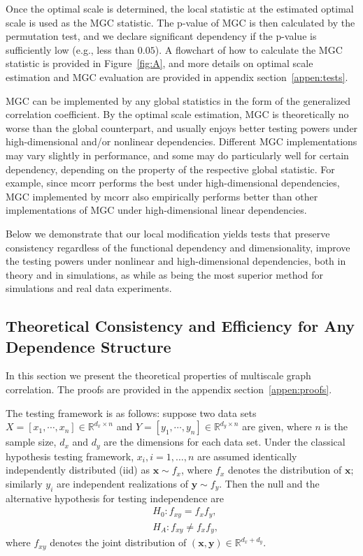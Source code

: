 \documentclass[11pt]{article}
\providecommand{\mb}[1]{\boldsymbol{#1}}
\newcommand{\Real}{\mathbb{R}}
\begin{document}
Once the optimal scale is determined, the local statistic at the estimated optimal scale is used as the MGC statistic. The p-value of MGC is then calculated by the permutation test, and we declare significant dependency if the p-value is sufficiently low (e.g., less than $0.05$). A flowchart of how to calculate the MGC statistic is provided in Figure~\ref{fig:A}, and more details on optimal scale estimation and MGC evaluation are provided in appendix section~\ref{appen:tests}.

MGC can be implemented by any global statistics in the form of the generalized correlation coefficient. By the optimal scale estimation, MGC is theoretically no worse than the global counterpart, and usually enjoys better testing powers under high-dimensional and/or nonlinear dependencies. Different MGC implementations may vary slightly in performance, and some may do particularly well for certain dependency, depending on the property of the respective global statistic. For example, since mcorr performs the best under high-dimensional dependencies, MGC implemented by mcorr also empirically performs better than other implementations of MGC under high-dimensional linear dependencies. 

Below we demonstrate that our local modification yields tests that preserve consistency regardless of the functional dependency and dimensionality, improve the testing powers under nonlinear and high-dimensional dependencies, both in theory and in simulations, as while as being the most superior method for simulations and real data experiments.


\subsection{Theoretical Consistency and Efficiency for Any Dependence Structure}
\label{main2}
In this section we present the theoretical properties of multiscale graph correlation. The proofs are provided in the appendix section~\ref{appen:proofs}. 

The testing framework is as follows: suppose two data sets $X=[x_{1},\cdots, x_{n}] \in \Real^{d_{x} \times n}$ and $Y=[y_{1},\cdots, y_{n}] \in \Real^{d_{y} \times n}$ are given, where $n$ is the sample size, $d_{x}$ and $d_{y}$ are the dimensions for each data set. Under the classical hypothesis testing framework, $x_{i}, i=1,\ldots,n$ are assumed identically independently distributed (iid) as $\mb{x} \sim f_{x}$, where $f_{x}$ denotes the distribution of $\mb{x}$; similarly $y_{i}$ are independent realizations of $\mb{y} \sim f_{y}$. Then the null and the alternative hypothesis for testing independence are
\begin{align*}
& H_{0}: f_{xy}=f_{x}f_{y},\\
& H_{A}: f_{xy} \neq f_{x}f_{y},
\end{align*}
where $f_{xy}$ denotes the joint distribution of $(\mb{x},\mb{y}) \in \Real^{d_{x} + d_{y}}$. 
\end{document}
